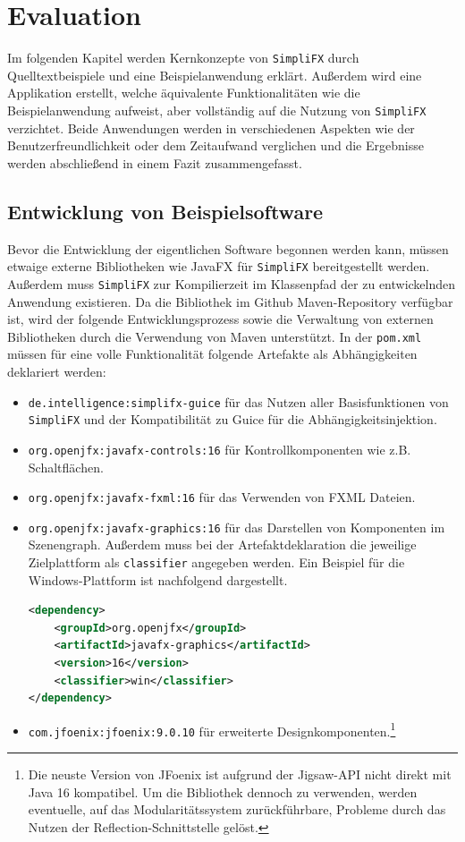 \chapter{Evaluation}
\label{evaluation}
Im folgenden Kapitel werden Kernkonzepte von \texttt{SimpliFX} durch Quelltextbeispiele und eine Beispielanwendung erklärt. Außerdem wird eine Applikation erstellt, welche äquivalente Funktionalitäten wie die Beispielanwendung aufweist, aber vollständig auf die Nutzung von \texttt{SimpliFX} verzichtet. Beide Anwendungen werden in verschiedenen Aspekten wie der Benutzerfreundlichkeit oder dem Zeitaufwand verglichen und die Ergebnisse werden abschließend in einem Fazit zusammengefasst. 

\section{Entwicklung von Beispielsoftware}
\label{entwicklung_von_beispielsoftware}
\noindent Bevor die Entwicklung der eigentlichen Software begonnen werden kann, müssen etwaige externe Bibliotheken wie JavaFX für \texttt{SimpliFX} bereitgestellt werden. Außerdem muss \texttt{SimpliFX} zur Kompilierzeit im Klassenpfad der zu entwickelnden Anwendung existieren. Da die Bibliothek im Github Maven-Repository verfügbar ist, wird der folgende Entwicklungsprozess sowie die Verwaltung von externen Bibliotheken durch die Verwendung von Maven unterstützt. In der \texttt{pom.xml} müssen für eine volle Funktionalität folgende Artefakte als Abhängigkeiten deklariert werden:
\begin{itemize}
	\item \texttt{de.intelligence:simplifx-guice} für das Nutzen aller Basisfunktionen von \texttt{SimpliFX} und der Kompatibilität zu Guice für die Abhängigkeitsinjektion.
	\item \texttt{org.openjfx:javafx-controls:16} für Kontrollkomponenten wie z.B. Schaltflächen.
	\item \texttt{org.openjfx:javafx-fxml:16} für das Verwenden von FXML Dateien.
	\item \texttt{org.openjfx:javafx-graphics:16} für das Darstellen von Komponenten im Szenengraph. Außerdem muss bei der Artefaktdeklaration die jeweilige Zielplattform als \texttt{classifier} angegeben werden. Ein Beispiel für die Windows-Plattform ist nachfolgend dargestellt.
	\begin{lstlisting}[language=XML, frame=none, belowskip=0pt]
<dependency>
    <groupId>org.openjfx</groupId>
    <artifactId>javafx-graphics</artifactId>
    <version>16</version>
    <classifier>win</classifier>
</dependency>	
	\end{lstlisting}
	\item \texttt{com.jfoenix:jfoenix:9.0.10} für erweiterte Designkomponenten.\footnote{Die neuste Version von JFoenix ist aufgrund der Jigsaw-API nicht direkt mit Java 16 kompatibel. Um die Bibliothek dennoch zu verwenden, werden eventuelle, auf das Modularitätssystem zurückführbare, Probleme durch das Nutzen der Reflection-Schnittstelle gelöst.}
\end{itemize}
